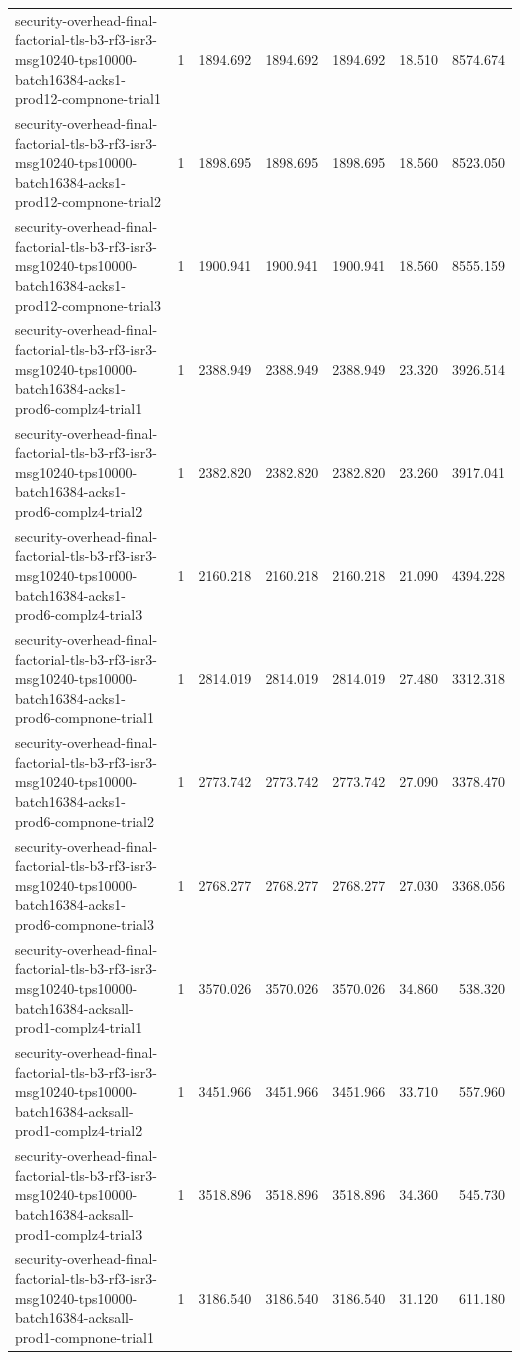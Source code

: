 \begin{tabular}{lrrrrrr}
security-overhead-final-factorial-tls-b3-rf3-isr3-msg10240-tps10000-batch16384-acks1-prod12-compnone-trial1 & 1 & 1894.692 & 1894.692 & 1894.692 & 18.510 & 8574.674 \\
security-overhead-final-factorial-tls-b3-rf3-isr3-msg10240-tps10000-batch16384-acks1-prod12-compnone-trial2 & 1 & 1898.695 & 1898.695 & 1898.695 & 18.560 & 8523.050 \\
security-overhead-final-factorial-tls-b3-rf3-isr3-msg10240-tps10000-batch16384-acks1-prod12-compnone-trial3 & 1 & 1900.941 & 1900.941 & 1900.941 & 18.560 & 8555.159 \\
security-overhead-final-factorial-tls-b3-rf3-isr3-msg10240-tps10000-batch16384-acks1-prod6-complz4-trial1 & 1 & 2388.949 & 2388.949 & 2388.949 & 23.320 & 3926.514 \\
security-overhead-final-factorial-tls-b3-rf3-isr3-msg10240-tps10000-batch16384-acks1-prod6-complz4-trial2 & 1 & 2382.820 & 2382.820 & 2382.820 & 23.260 & 3917.041 \\
security-overhead-final-factorial-tls-b3-rf3-isr3-msg10240-tps10000-batch16384-acks1-prod6-complz4-trial3 & 1 & 2160.218 & 2160.218 & 2160.218 & 21.090 & 4394.228 \\
security-overhead-final-factorial-tls-b3-rf3-isr3-msg10240-tps10000-batch16384-acks1-prod6-compnone-trial1 & 1 & 2814.019 & 2814.019 & 2814.019 & 27.480 & 3312.318 \\
security-overhead-final-factorial-tls-b3-rf3-isr3-msg10240-tps10000-batch16384-acks1-prod6-compnone-trial2 & 1 & 2773.742 & 2773.742 & 2773.742 & 27.090 & 3378.470 \\
security-overhead-final-factorial-tls-b3-rf3-isr3-msg10240-tps10000-batch16384-acks1-prod6-compnone-trial3 & 1 & 2768.277 & 2768.277 & 2768.277 & 27.030 & 3368.056 \\
security-overhead-final-factorial-tls-b3-rf3-isr3-msg10240-tps10000-batch16384-acksall-prod1-complz4-trial1 & 1 & 3570.026 & 3570.026 & 3570.026 & 34.860 & 538.320 \\
security-overhead-final-factorial-tls-b3-rf3-isr3-msg10240-tps10000-batch16384-acksall-prod1-complz4-trial2 & 1 & 3451.966 & 3451.966 & 3451.966 & 33.710 & 557.960 \\
security-overhead-final-factorial-tls-b3-rf3-isr3-msg10240-tps10000-batch16384-acksall-prod1-complz4-trial3 & 1 & 3518.896 & 3518.896 & 3518.896 & 34.360 & 545.730 \\
security-overhead-final-factorial-tls-b3-rf3-isr3-msg10240-tps10000-batch16384-acksall-prod1-compnone-trial1 & 1 & 3186.540 & 3186.540 & 3186.540 & 31.120 & 611.180 \\

\end{tabular}

